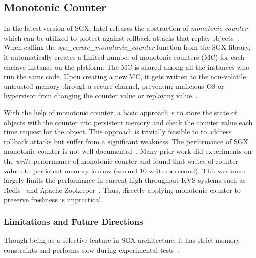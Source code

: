

\subsection{Monotonic Counter}

In the latest version of SGX, Intel releases the abstraction of \textit{monotonic counter} which can be utilized to 
protect against rollback attacks that replay objects~\cite{alder2018migrating}. When calling the 
\textit{sgx\_cerate\_monotonic\_counter} function from the SGX library, it automatically creates a 
limited number of monotonic counters (MC) for each enclave instance on the platform. The MC is shared 
among all the instances who run the same code. Upon creating a new MC, it gets written to the non-volatile
untrusted memory through a secure channel, preventing malicious OS or hypervisor from changing the counter 
value or replaying value~\cite{shinde2017panoply}.

With the help of monotonic counter, a basic approach is to store
the state of objects with the counter into persistent memory and check the counter value 
each time request for the object. This approach is trivially feasible to to address 
rollback attacks but suffer from a significant weakness. The performance of SGX monotonic 
counter is not well documented~\cite{strackx2016ariadne}. Many prior work did experiments on the \textit{write}
performance of monotonic counter and found that writes of counter values to persistent
memory is slow (around 10 writes a second). This weakness largely limits the performance in 
current high throughput KVS systems such as Redis~\cite{paksula2010persisting} and Apache Zookeeper~\cite{hunt2010zookeeper}.
Thus, directly applying monotonic counter to preserve freshness is impractical.



\subsubsection{Limitations and Future Directions}
Though being as a selective feature in SGX architecture, it has strict memory constraints and performs slow during experimental tests~\cite{alder2018migrating}. 

